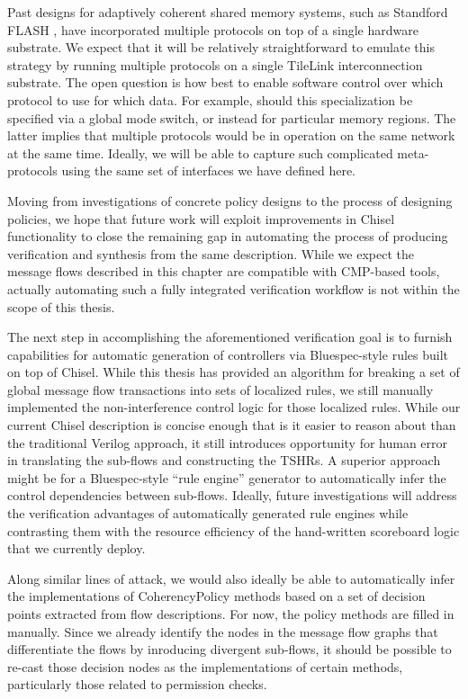 Past designs for adaptively coherent shared memory systems, such as Standford FLASH \cite{kuskin-archnews94}, 
have incorporated multiple protocols on top of a single hardware substrate. 
We expect that it will be relatively straightforward  to emulate this strategy by
running multiple protocols on a single TileLink interconnection substrate.
The open question is how best to enable software control over which protocol to use for which data.
For example, should this specialization be specified via a global mode switch, or instead for particular memory regions.
The latter implies that multiple protocols would be in operation on the same network at the same time.
Ideally, we will be able to capture such complicated meta-protocols using the same set of interfaces we have defined here.

Moving from investigations of concrete policy designs to the process of designing policies,
we hope that future work will exploit improvements in Chisel functionality to close the remaining gap in
automating the process of producing verification and synthesis from the same description.
While we expect the message flows described in this chapter are compatible with CMP-based tools,
actually automating such a fully integrated verification workflow is not within the scope of this thesis.

The next step in accomplishing the aforementioned verification goal is to furnish capabilities for
automatic generation of controllers via Bluespec-style rules built on top of Chisel.
While this thesis has provided an algorithm for  breaking a set of
global message flow transactions into sets of localized rules,
we still manually implemented the non-interference control logic for those localized rules.
While our current Chisel description is concise enough that is it easier to reason about than the traditional Verilog approach,
it still introduces opportunity for human error in translating the sub-flows and constructing the TSHRs.
A superior approach might be for a Bluespec-style ``rule engine'' generator to automatically infer the control dependencies between sub-flows.
Ideally, future investigations will address the verification advantages of automatically generated rule engines while
contrasting them with the resource efficiency of the hand-written scoreboard logic that we currently deploy.

Along similar lines of attack, we would also ideally be able to automatically infer the implementations of CoherencyPolicy methods
based on a set of decision points extracted from flow descriptions.
For now, the policy methods are filled in manually.
Since we already identify the nodes in the message flow graphs that differentiate the flows by
inroducing divergent sub-flows, it should be possible to re-cast those decision nodes as the implementations of certain methods,
particularly those related to permission checks.

